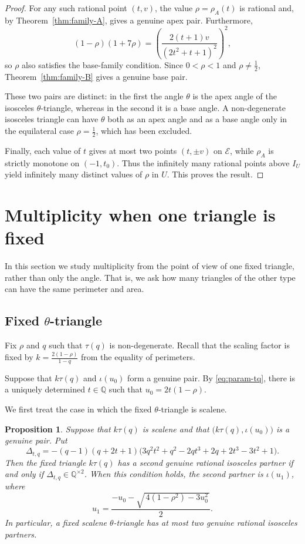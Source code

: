 \documentclass[11pt]{amsart}
\theoremstyle{plain}
\newtheorem{prop}[thm]{Proposition}
\theoremstyle{remark}
\theoremstyle{plain}
\newcommand{\Q}{\mathbb{Q}}
\begin{document}
\begin{proof}
For any such rational point $(t,v)$, the value
$\rho=\rho_A(t)$ is rational and, by
Theorem~\ref{thm:family-A}, gives a genuine apex pair. Furthermore,
\[
(1-\rho)(1+7\rho)
=
\left(
\frac{2(t+1)v}{(2t^2+t+1)^2}
\right)^2,
\]
so $\rho$ also satisfies the base-family condition. Since
$0<\rho<1$ and $\rho\ne\frac12$, Theorem~\ref{thm:family-B} gives a
genuine base pair.

These two pairs are distinct: in the first the angle $\theta$ is the
apex angle of the isosceles $\theta$-triangle, whereas in the second
it is a base angle. A non-degenerate isosceles triangle can have
$\theta$ both as an apex angle and as a base angle only in the
equilateral case $\rho=\frac12$, which has been excluded.

Finally, each value of $t$ gives at most two points $(t,\pm v)$ on
$\mathcal E$, while $\rho_A$ is strictly monotone on $(-1,t_0)$.
Thus the infinitely many rational points above $I_U$ yield infinitely
many distinct values of $\rho$ in $U$. This proves the result.
\end{proof}




\section{Multiplicity when one triangle is fixed} \label{sec:fixed-triangle}

In this section we study multiplicity from the point of view of one
fixed triangle, rather than only the angle. That is, we ask how many triangles of the other type can have
the same perimeter and area.

\subsection{Fixed $\theta$-triangle}

Fix $\rho$ and $q$ such that $\tau(q)$ is non-degenerate. Recall that the scaling factor is fixed by
$k=\frac{2(1-\rho)}{1-q}$ from the equality of perimeters.


Suppose that $k\tau(q)$ and $\iota(u_0)$ form a genuine pair. By
\eqref{eq:param-tq}, there is a uniquely determined $t\in\Q$ such that $u_0=2t(1-\rho).$

We first treat the case in which the fixed $\theta$-triangle is
scalene.

\begin{prop}\label{prop:several-isosceles-partners}
Suppose that $k\tau(q)$ is scalene and that
$\bigl(k\tau(q),\iota(u_0)\bigr)$ is a genuine pair. Put
\[
\Delta_{t,q}
=
-(q-1)(q+2t+1)
\bigl(
3q^2t^2+q^2-2qt^3+2q+2t^3-3t^2+1
\bigr).
\]
Then the fixed triangle $k\tau(q)$ has a second genuine rational
isosceles partner if and only if
$\Delta_{t,q}\in\Q^{\times2}$.
When this condition holds, the second partner is
$\iota(u_1)$, where
\[
u_1=
\frac{
-u_0-\sqrt{\,4(1-\rho^2)-3u_0^2\,}
}{2}.
\]
In particular, a fixed scalene $\theta$-triangle has at most two
genuine rational isosceles partners.
\end{prop}
\end{document}
